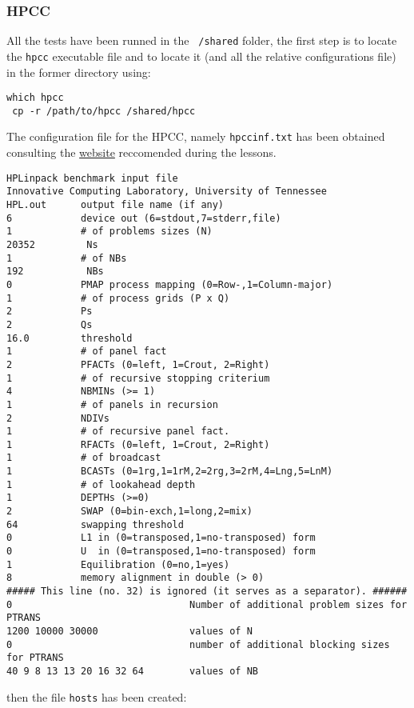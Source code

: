 \subsubsection{HPCC}
All the tests have been runned in the \texttt{ /shared} folder, the first step is to locate the \texttt{hpcc} executable file and to locate it (and all the relative configurations file) in the former directory using:

\begin{verbatim}
which hpcc
 cp -r /path/to/hpcc /shared/hpcc
\end{verbatim}

The configuration file for the HPCC, namely \texttt{hpccinf.txt} has been obtained consulting the \href{https://www.advancedclustering.com/act_kb/tune-hpl-dat-file/}{website} reccomended during the lessons.

\begin{verbatim}
HPLinpack benchmark input file
Innovative Computing Laboratory, University of Tennessee
HPL.out      output file name (if any) 
6            device out (6=stdout,7=stderr,file)
1            # of problems sizes (N)
20352         Ns
1            # of NBs
192           NBs
0            PMAP process mapping (0=Row-,1=Column-major)
1            # of process grids (P x Q)
2            Ps
2            Qs
16.0         threshold
1            # of panel fact
2            PFACTs (0=left, 1=Crout, 2=Right)
1            # of recursive stopping criterium
4            NBMINs (>= 1)
1            # of panels in recursion
2            NDIVs
1            # of recursive panel fact.
1            RFACTs (0=left, 1=Crout, 2=Right)
1            # of broadcast
1            BCASTs (0=1rg,1=1rM,2=2rg,3=2rM,4=Lng,5=LnM)
1            # of lookahead depth
1            DEPTHs (>=0)
2            SWAP (0=bin-exch,1=long,2=mix)
64           swapping threshold
0            L1 in (0=transposed,1=no-transposed) form
0            U  in (0=transposed,1=no-transposed) form
1            Equilibration (0=no,1=yes)
8            memory alignment in double (> 0)
##### This line (no. 32) is ignored (it serves as a separator). ######
0                               Number of additional problem sizes for PTRANS
1200 10000 30000                values of N
0                               number of additional blocking sizes for PTRANS
40 9 8 13 13 20 16 32 64        values of NB
\end{verbatim}

then the file \texttt{hosts} has been created:

